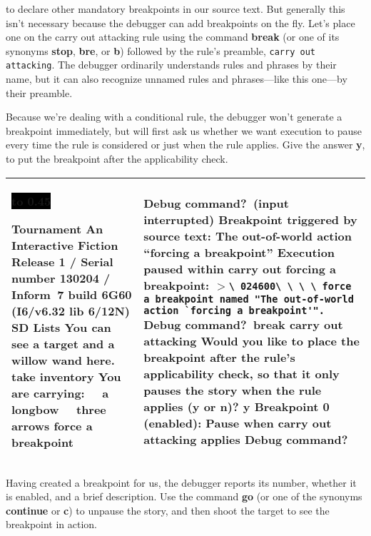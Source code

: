 \documentclass{book}
\newcommand{\n}{\hspace*{\fill}\newline}
\newcommand{\terp}[2]{\begin{center}\begin{tabular}{p{0.45\textwidth}|p{0.45\textwidth}}\midrule #1&#2\\\midrule\end{tabular}\end{center}}
\newcommand{\glkheading}[1]{\textbf{#1}}
\newcommand{\glkinput}[1]{\textbf{#1}}
\newcommand{\glkstatusline}[2]{\centerline{\colorbox{black}{\hbox to 0.45\textwidth{\textcolor{white}{#1\hfil #2}}}}}
\newcommand{\storyprompt}{\raisebox{1.5pt}{\(>\)}}
\newcommand{\cursor}{\raisebox{-1.5pt}{\RectangleThin}}
\newcommand{\markedindent}{\(>\)}
\begin{document}
\noindent to declare other mandatory breakpoints in our source text.  But
generally this isn't necessary because the debugger can add breakpoints on the
fly.  Let's place one on the carry out attacking rule using the command
\glkinput{break} (or one of its synonyms \glkinput{stop}, \glkinput{bre}, or
\glkinput{b}) followed by the rule's preamble, \lstinline{carry out attacking}.
The debugger ordinarily understands rules and phrases by their name, but it can
also recognize unnamed rules and phrases---like this one---by their preamble.

Because we're dealing with a conditional rule, the debugger won't generate a
breakpoint immediately, but will first ask us whether we want execution to pause
every time the rule is considered or just when the rule applies.  Give the
answer \glkinput{y}, to put the breakpoint after the applicability check.

\terp{\glkstatusline{Lists}{0/2}\n
  \glkheading{Tournament}\n
  An Interactive Fiction\n
  Release 1 / Serial number 130204 / Inform~7 build 6G60 (I6/v6.32 lib 6/12N) SD\n
  \n
  \glkheading{Lists}\n
  You can see a target and a willow wand here.\n
  \n
  \storyprompt\glkinput{take inventory}\n
  You are carrying:\n
  \null\ \ a longbow\n
  \null\ \ three arrows\n
  \n
  \storyprompt\glkinput{force a breakpoint}}{%
  Debug command?\ (input interrupted)\n
  \n
  \glkheading{Breakpoint triggered by source text:} The out-of-world action ``forcing a breakpoint''\n
  \n
  Execution paused within carry out forcing a breakpoint:\n
  \markedindent \lstinline{\ 024600\ \ \ \ force a breakpoint named "The out-of-world action `forcing a breakpoint'".}\n
  \n
  Debug command?\ \glkinput{break carry out attacking}\n
  \n
  Would you like to place the breakpoint after the rule's applicability check, so that it only pauses the story when the rule applies (y or n)? \glkinput{y}\n
  \n
  Breakpoint 0 (enabled): Pause when carry out attacking applies\n
  \n
  Debug command?\ \cursor}

Having created a breakpoint for us, the debugger reports its number, whether it
is enabled, and a brief description.  Use the command \glkinput{go} (or one of
the synonyms \glkinput{continue} or \glkinput{c}) to unpause the story, and then
shoot the target to see the breakpoint in action.
\end{document}
